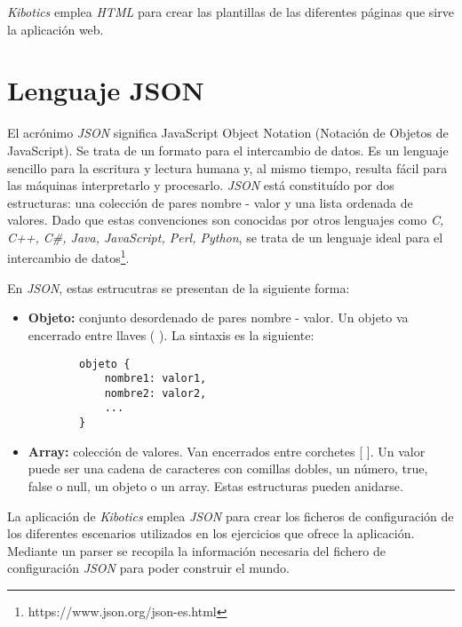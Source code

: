 \textit{Kibotics} emplea \textit{HTML} para crear las plantillas de las diferentes páginas que sirve la aplicación web.

\section{Lenguaje JSON}
El acrónimo \textit{JSON} significa JavaScript Object Notation (Notación de Objetos de JavaScript). Se trata de un formato para el intercambio de datos. Es un lenguaje sencillo para la escritura y lectura humana y, al mismo tiempo, resulta fácil para las máquinas interpretarlo y procesarlo. \textit{JSON} está constituído por dos estructuras: una colección de pares nombre - valor y una lista ordenada de valores. Dado que estas convenciones son conocidas por otros lenguajes como  \textit{C, C++, C#, Java, JavaScript, Perl, Python}, se trata de un lenguaje ideal para el intercambio de datos\footnote{https://www.json.org/json-es.html}. \newline

En \textit{JSON}, estas estrucutras se presentan de la siguiente forma:
\begin{itemize}
    \item \textbf{Objeto: } conjunto desordenado de pares nombre - valor. Un objeto va encerrado entre llaves ({ }). La sintaxis es la siguiente: 
    \begin{verbatim}
        objeto {
            nombre1: valor1,
            nombre2: valor2,
            ...
        }
    \end{verbatim}
    \item \textbf{Array: } colección de valores. Van encerrados entre corchetes [ ]. Un valor puede ser una cadena de caracteres con comillas dobles, un número, true, false o null, un objeto o un array. Estas estructuras pueden anidarse.

\end{itemize}

La aplicación de \textit{Kibotics} emplea \textit{JSON} para crear los ficheros de configuración de los diferentes escenarios utilizados en los ejercicios que ofrece la aplicación. Mediante un parser se recopila la información necesaria del fichero de configuración \textit{JSON} para poder construir el mundo.

